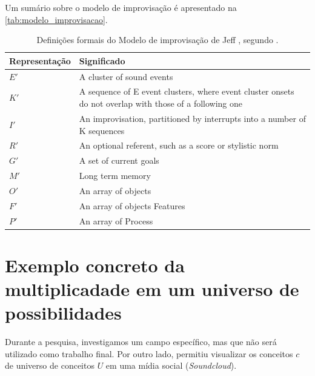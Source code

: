 Um sumário sobre o modelo de improvisação é apresentado na \autoref{tab:modelo_improvisacao}.

\begin{table}[!h]
\caption{Definições formais do Modelo de improvisação de Jeff , segundo .}
\small
    \begin{tabular}{ | p{4cm} | p{5.5cm} |}
    \hline 
    \hline 

    \tiny{Representação}   
    & \tiny{Significado} \\
    \hline

    $E'$
    & \tiny{A cluster of sound events} \\
    \hline

    $K'$
    & \tiny{A sequence of E event clusters, where event cluster onsets do not overlap with those of a following one}\\
    \hline

    $I'$
    & \tiny{An improvisation, partitioned by interrupts into a number of K sequences} \\
    \hline

    $R'$
    & \tiny{An optional referent, such as a score or stylistic norm} \\
    \hline

    $G'$
    & \tiny{A set of current goals} \\
    \hline

    $M'$
    & \tiny{Long term memory} \\
    \hline

    $O'$
    & \tiny{An array of objects} \\
    \hline

    $F'$
    & \tiny{An array of objects Features} \\
    \hline

    $P'$
    & \tiny{An array of Process} \\
    \hline
    \hline
   
    \end{tabular}
\label{tab:universodeconceitos}
\end{table}

\section{Exemplo concreto da multiplicadade em um universo de possibilidades}

Durante a pesquisa, investigamos um campo específico, mas que não será utilizado como trabalho final. Por outro lado, permitiu visualizar os conceitos  $c$ de universo de conceitos $U$ em uma mídia social (\emph{Soundcloud}).

